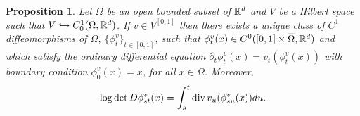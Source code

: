 \documentclass[noinfoline]{imsart}
\newtheorem{proposition}{Proposition}
\begin{document}
\begin{proposition} 
\label{PropDef} Let $\Omega$ be an open bounded subset of $\Bbb R^d$ and $V$ be a Hilbert space such that  $V\hookrightarrow C_0^1(\Omega,\Bbb R^d)$. If   $v\in V^{[0,1]}$ then there exists a unique  class of $C^1$ diffeomorphisms of $\Omega$,  $\{\phi_{t}^v\}_{t\in [0,1]}$, such that  $\phi_t^v(x)\in C^0 ([0,1]\times \overline \Omega,\Bbb R^d)$ and  which satisfy the ordinary differential equation $
 \partial_t \phi_t^v(x) = v_t(\phi_t^v(x)) $ with boundary condition $\phi_0^v(x)=x$, for all $x\in \Omega$. 
Moreover,
 \begin{equation}
 \label{div}
  \log\det D\phi_{st}^v(x)  = \int_s^t  \text{\rm div}\,  v_u (\phi_{su}^v(x))du. 
  \end{equation}
 \end{proposition}
\end{document}
